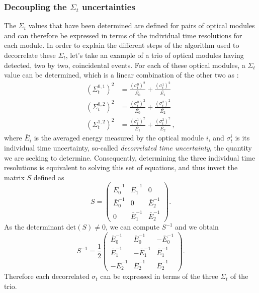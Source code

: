 
\subsubsection*{Decoupling the $\Sigma_{t}$ uncertainties}

The $\Sigma_{t}$ values that have been determined are defined for pairs of optical modules and can therefore be expressed in terms of the individual time resolutions for each module.
In order to explain the different steps of the algorithm used to decorrelate these $\Sigma_{t}$, let's take an example of a trio of optical modules having detected, two by two, coincidental events.
For each of these optical modules, a $\Sigma_{t}$ value can be determined, which is a linear combination of the other two as :
\begin{align}
  (\Sigma_{t}^{0,1})^{2} &= \frac{(\sigma_{t}^{0})^{2}}{\bar{E_{0}}} + \frac{(\sigma_{t}^{1})^{2}}{\bar{E_{1}}}\nonumber \\
  (\Sigma_{t}^{0,2})^{2} &= \frac{(\sigma_{t}^{0})^{2}}{\bar{E_{0}}} + \frac{(\sigma_{t}^{2})^{2}}{\bar{E_{2}}}\\
  (\Sigma_{t}^{1,2})^{2} &= \frac{(\sigma_{t}^{1})^{2}}{\bar{E_{1}}} + \frac{(\sigma_{t}^{2})^{2}}{\bar{E_{2}}} \nonumber\,,
  \label{eq:Co_sigma}
\end{align}
where $\bar{E}_{i}$ is the averaged energy measured by the optical module $i$, and $\sigma_{t}^{i}$ is its individual time uncertainty, so-called \emph{decorrelated time uncertainty}, the quantity we are seeking to determine.
Consequently, determining the three individual time resolutions is equivalent to solving this set of equations, and thus invert the matrix $S$ defined as
\begin{equation}
  S =
  \begin{pmatrix}
    \bar{E}_{0}^{-1} & \bar{E}_{1}^{-1} & 0 \\
    \bar{E}_{0}^{-1} & 0 & \bar{E}_{2}^{-1} \\
    0 & \bar{E}_{1}^{-1} & \bar{E}_{2}^{-1}
  \end{pmatrix}
  .
\end{equation}
As the determinant $\text{det}(S)\neq0$, we can compute $S^{-1}$ and we obtain
\begin{equation}
  S^{-1} = \frac{1}{2}
  \begin{pmatrix}
    \bar{E}_{0}^{-1} & \bar{E}_{0}^{-1} & -\bar{E}_{0}^{-1} \\
    \bar{E}_{1}^{-1} & -\bar{E}_{1}^{-1} & \bar{E}_{1}^{-1} \\
    -\bar{E}_{2}^{-1} & \bar{E}_{2}^{-1} & \bar{E}_{2}^{-1}
  \end{pmatrix}
  .
\end{equation}
Therefore each decorrelated $\sigma_{t}$ can be expressed in terms of the three $\Sigma_{t}$ of the trio.

